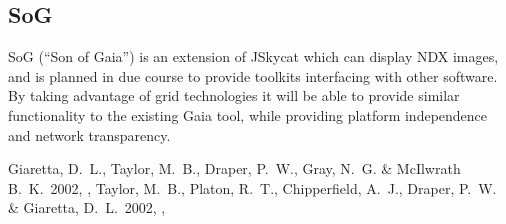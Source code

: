 \subsection{SoG}
\label{sec:sog}

SoG (``Son of Gaia'') is an extension of JSkycat which can display
NDX images, and is planned in due course to provide toolkits interfacing
with other software.
By taking advantage of grid technologies it will be able to provide
similar functionality to the existing Gaia tool, while providing
platform independence and network transparency.


\begin{references}
{} Giaretta, D.\ L., Taylor, M.\ B., Draper, P.\ W., Gray, N.\ G. \&
           McIlwrath B.\ K.\ 2002, \adassxii, 
 Taylor, M.\ B., Platon, R.\ T., Chipperfield, A.\ J.,
           Draper, P.\ W. \& Giaretta, D.\ L.\ 2002, \adassxii, 
\end{references}


